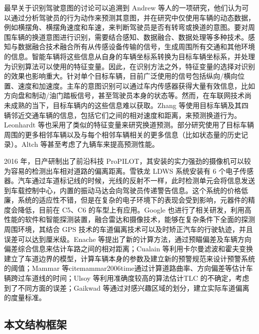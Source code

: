   最早关于识别驾驶意图的讨论可以追溯到 Andrew 等人的一项研究\cite{liu1997realtime}，他们认为可以通过分析驾驶员的行为动作来预测其意图，并在研究中仅使用车辆的动态数据，例如横摆角、横摆角速度和车速，来判断驾驶员是否有转弯或换道的意图。要对周围车辆的换道意图进行识别，需要结合感知、数据融合、数据处理等多种技术\cite{zhang2023highway}。感知与数据融合技术融合所有从传感设备传输的信号，生成周围所有交通和其他环境的信息。智能车辆将这些信息从自身的车辆坐标系转换为目标车辆坐标系，并处理为识别算法可以使用的特征变量。因此，在识别方法之外，特征变量的选择对识别的效果也影响重大。针对单个目标车辆，目前广泛使用的信号包括纵向/横向位置、速度和加速度\cite{woo2017lane}。主车的意图识别可以通过车内传感器获得大量有效信息，比如方向盘和制动/油门踏板信号，甚至驾驶员本身的状态等。然而，在车联网技术尚未成熟的当下，目标车辆内的这些信息难以获取。Zhang 等\cite{zhang2018lane}使用目标车辆及其四辆邻近交通车辆的信息，包括它们之间的相对速度和距离，来预测换道行为。Leonhardt 等\cite{leonhardt2017feature}也采用了类似的特征变量来研究换道预测。部分研究使用了目标车辆周围的更多相邻车辆以及与每个相邻车辆相关的更多信息（比如状态量的历史记录）\cite{patel2018predicting}。Altch 等\cite{altche2017lstm}甚至考虑了九辆车来提高预测性能。

  2016 年，日产研制出了前沿科技 ProPILOT，其安装的实力强劲的摄像机可以较为容易的检测出车相对道路的偏离距离\cite{zhang2016nissan}。雪铁龙 LDWS 系统安装有 6 个电子传感器。汽车通过车道标记线的时候，光线的反射不一样，此时检测单元会将信息发送到车载控制中心，内置的振动马达会向驾驶员传递警告信息。这个系统的价格低廉，系统的适应性不错，但是在复杂的电子环境下的表现会受到影响，元器件的精度会降低，目前在 C5、C6 的车型上有应用。Google 也进行了相关研发，利用高性能的软件和智能探测装置，融合雷达和摄像技术，能够在复杂条件下全面的探测周围环境\cite{wang2020autonomous}，其结合 GPS 技术的车道偏离技术可以及时矫正汽车的行驶轨迹，并且误差可以达到厘米级。Enache 等\cite{enache2009driver}提出了新的计算方法，通过预瞄偏差及车辆方向偏差综合信息来估计车路之间的相对距离；Cualain 等\cite{cualain2012automotive}利用卡尔曼滤波和霍夫变换建立了车道边界的模型，计算车辆本身的参数及建立新的预警规范来设计预警系统的阈值；Mammar 等cite{mammar2006time}通过计算道路曲率、方向偏差等估计车辆跨过车道线的时间；Ulsoy 等\cite{chiu1996time}利用准确度较高的算法估计TLC 的不确定，考虑到了不同方面的误差；Gaikwad 等\cite{gaikwad2015lane}通过对感兴趣区域的划分，建立实际车道偏离的度量标准。

\subsection{本文结构框架}

